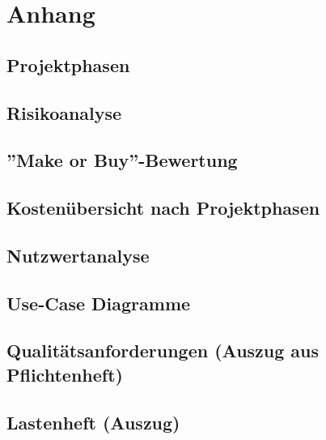 \renewcommand{\thesection}{\Alph{subsection}}

\appendix
{}
\section{Anhang}
	
	\subsection{Projektphasen}		
		
		\newpage

	\subsection{Risikoanalyse}		
		
		\newpage		
		
	\subsection{''Make or Buy''-Bewertung}		
		
		\newpage
	
	\subsection{Kostenübersicht nach Projektphasen}		
		
		\newpage

	\subsection{Nutzwertanalyse}		
		
		\newpage
		
	\subsection{Use-Case Diagramme}		
		
		\newpage		
		
	\subsection{Qualitätsanforderungen (Auszug aus Pflichtenheft)}		
		
		\newpage
		
	\subsection{Lastenheft (Auszug)}
		
		\newpage
		
